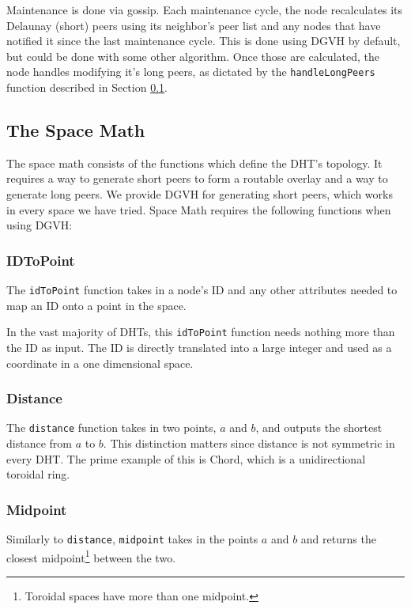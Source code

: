 \documentclass[11pt,conference]{IEEEtran}
\begin{document}
Maintenance is done via gossip.
Each maintenance cycle, the node recalculates its Delaunay (short) peers using its neighbor's peer list and any nodes that have notified it since the last maintenance cycle.
This is done using DGVH by default, but could be done with some other algorithm.
Once those are calculated, the node handles modifying it's long peers, as dictated by the \texttt{handleLongPeers} function described in Section \ref{sec:space}.

\subsection{The Space Math}
\label{sec:space}
The space math consists of the functions which define the DHT's topology.
It requires a way to generate short peers to form a routable overlay and a way to generate long peers.
We provide DGVH for generating short peers, which works in every space we have tried.
Space Math requires the following functions when using DGVH:

\subsubsection{IDToPoint}
The \texttt{idToPoint} function takes in a node's ID and any other attributes needed to map an ID onto a point in the space.

In the vast majority of DHTs, this \texttt{idToPoint} function needs nothing more than the ID as input.
The ID is directly translated into a large integer and used as a coordinate in a one dimensional space.


\subsubsection{Distance}
The \texttt{distance} function takes in two points, $a$ and $b$, and outputs the shortest distance from $a$ to $b$.
This distinction matters since distance is not symmetric in every DHT.
The prime example of this is Chord, which is a unidirectional toroidal ring.


\subsubsection{Midpoint}

Similarly to \texttt{distance}, \texttt{midpoint} takes in the points $ a $ and $ b $ and returns the closest midpoint\footnote{Toroidal spaces have more than one midpoint.} between the two.
\end{document}
